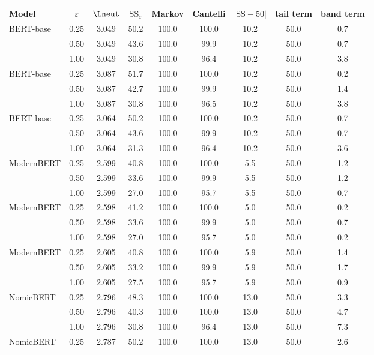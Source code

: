   \footnotesize\setlength{\tabcolsep}{4pt}
  \begin{tabular}{@{}lcccccccc@{}}
    \toprule
    Model & $\varepsilon$ & $\Lneut$ & $\mathrm{SS}_\varepsilon$ & Markov & Cantelli & $|\mathrm{SS}-50|$ & tail term & band term \\
    \midrule
    BERT-base & 0.25 & 3.049 & 50.2 & 100.0 & 100.0 & 10.2 & 50.0 & 0.7 \\
     & 0.50 & 3.049 & 43.6 & 100.0 & 99.9 & 10.2 & 50.0 & 0.7 \\
     & 1.00 & 3.049 & 30.8 & 100.0 & 96.4 & 10.2 & 50.0 & 3.8 \\
    BERT-base & 0.25 & 3.087 & 51.7 & 100.0 & 100.0 & 10.2 & 50.0 & 0.2 \\
     & 0.50 & 3.087 & 42.7 & 100.0 & 99.9 & 10.2 & 50.0 & 1.4 \\
     & 1.00 & 3.087 & 30.8 & 100.0 & 96.5 & 10.2 & 50.0 & 3.8 \\
    BERT-base & 0.25 & 3.064 & 50.2 & 100.0 & 100.0 & 10.2 & 50.0 & 0.7 \\
     & 0.50 & 3.064 & 43.6 & 100.0 & 99.9 & 10.2 & 50.0 & 0.7 \\
     & 1.00 & 3.064 & 31.3 & 100.0 & 96.4 & 10.2 & 50.0 & 3.6 \\
    ModernBERT & 0.25 & 2.599 & 40.8 & 100.0 & 100.0 & 5.5 & 50.0 & 1.2 \\
     & 0.50 & 2.599 & 33.6 & 100.0 & 99.9 & 5.5 & 50.0 & 1.2 \\
     & 1.00 & 2.599 & 27.0 & 100.0 & 95.7 & 5.5 & 50.0 & 0.7 \\
    ModernBERT & 0.25 & 2.598 & 41.2 & 100.0 & 100.0 & 5.0 & 50.0 & 0.2 \\
     & 0.50 & 2.598 & 33.6 & 100.0 & 99.9 & 5.0 & 50.0 & 0.7 \\
     & 1.00 & 2.598 & 27.0 & 100.0 & 95.7 & 5.0 & 50.0 & 0.2 \\
    ModernBERT & 0.25 & 2.605 & 40.8 & 100.0 & 100.0 & 5.9 & 50.0 & 1.4 \\
     & 0.50 & 2.605 & 33.2 & 100.0 & 99.9 & 5.9 & 50.0 & 1.7 \\
     & 1.00 & 2.605 & 27.5 & 100.0 & 95.7 & 5.9 & 50.0 & 0.9 \\
    NomicBERT & 0.25 & 2.796 & 48.3 & 100.0 & 100.0 & 13.0 & 50.0 & 3.3 \\
     & 0.50 & 2.796 & 40.3 & 100.0 & 100.0 & 13.0 & 50.0 & 4.7 \\
     & 1.00 & 2.796 & 30.8 & 100.0 & 96.4 & 13.0 & 50.0 & 7.3 \\
    NomicBERT & 0.25 & 2.787 & 50.2 & 100.0 & 100.0 & 13.0 & 50.0 & 2.6 \\

\end{tabular}
